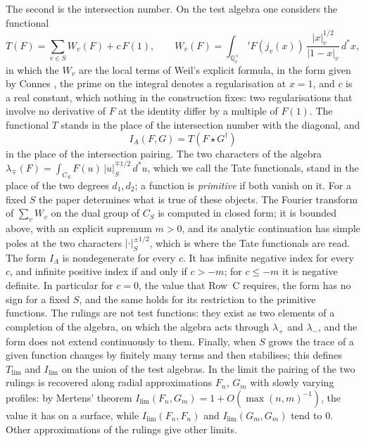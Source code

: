 \documentclass[10pt]{amsart}
\theoremstyle{definition}
\theoremstyle{remark}
\newcommand{\Q}{\mathbb Q}
\newcommand{\Tl}{T_{\lim}}
\newcommand{\Il}{I_{\lim}}
\begin{document}
The second is the intersection number. On the test algebra one considers the functional
\begin{equation}\label{eq:trace}
 T(F)=\sum_{v\in S}W_v(F)+c\,F(1),\qquad
 W_v(F)=\int_{\Q_v^\times}' F(j_v(x))\,\frac{|x|_v^{1/2}}{|1-x|_v}\,d^*x ,
\end{equation}
in which the $W_v$ are the local terms of Weil's explicit formula, in the form given by Connes
\cite[Appendix~II]{Connes99}, the prime on the integral denotes a regularisation at $x=1$, and
$c$ is a real constant, which nothing in the construction fixes: two regularisations that involve
no derivative of $F$ at the identity differ by a multiple of $F(1)$. The functional $T$ stands in
the place of the intersection number with the diagonal, and
\[
 I_A(F,G)=T(F\star G^\dagger)
\]
in the place of the intersection pairing. The two characters of the algebra
$\lambda_\mp(F)=\int_{C_S}F(u)\,|u|_S^{\mp1/2}\,d^*u$, which we call the Tate functionals, stand in
the place of the two degrees $d_1,d_2$; a function is \emph{primitive} if both vanish on it.
For a fixed $S$ the paper determines what is true of these objects. The Fourier transform of
$\sum_vW_v$ on the dual group of $C_S$ is computed in closed form; it is bounded above, with an
explicit supremum $m>0$, and its analytic continuation has simple poles at the two characters
$|\cdot|_S^{\pm1/2}$, which is where the Tate functionals are read. The form $I_A$ is
nondegenerate for every $c$. It has infinite negative index for every $c$, and infinite positive
index if and only if $c>-m$; for $c\le-m$ it is negative definite. In particular for $c=0$, the
value that Row~C requires, the form has no sign for a fixed $S$, and the same holds for its
restriction to the primitive functions. The rulings are not test functions: they exist as two elements
of a completion of the algebra, on which the algebra acts through $\lambda_+$ and $\lambda_-$,
and the form does not extend continuously to them. Finally, when $S$ grows the trace of a given
function changes by finitely many terms and then stabilises; this defines $\Tl$ and
$\Il$ on the union of the test algebras. In the limit the pairing of the two rulings is
recovered along radial approximations $F_n$, $G_m$ with slowly varying profiles: by Mertens'
theorem $\Il(F_n,G_m)=1+O(\max(n,m)^{-1})$, the value it has on a surface, while
$\Il(F_n,F_n)$ and $\Il(G_m,G_m)$ tend to $0$. Other approximations of the rulings give
other limits.
\end{document}
